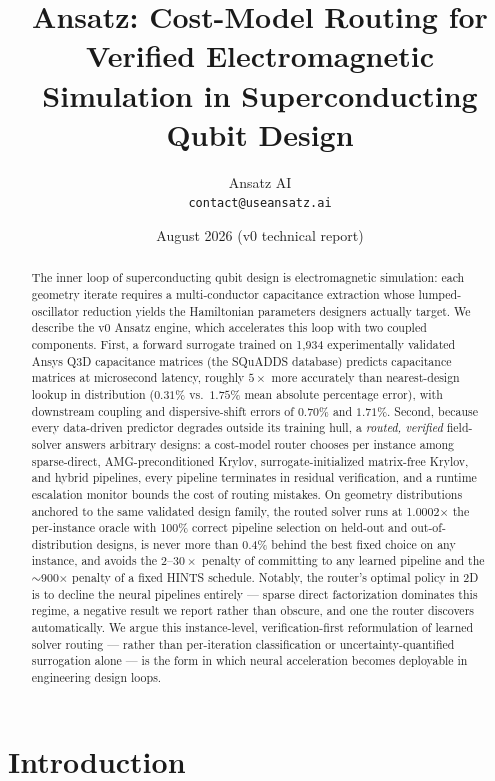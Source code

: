 \documentclass[11pt]{article}
\title{\textbf{Ansatz: Cost-Model Routing for Verified Electromagnetic
Simulation in Superconducting Qubit Design}}
\author{Ansatz AI\\ \texttt{contact@useansatz.ai}}
\date{August 2026 \quad (v0 technical report)}
\newcommand{\capmapegbr}{0.31\%}
\newcommand{\capmapenn}{1.75\%}
\newcommand{\gerrgbr}{0.70\%}
\newcommand{\chierrgbr}{1.71\%}
\begin{document}
\maketitle

\begin{abstract}
The inner loop of superconducting qubit design is electromagnetic simulation:
each geometry iterate requires a multi-conductor capacitance extraction whose
lumped-oscillator reduction yields the Hamiltonian parameters designers
actually target. We describe the v0 Ansatz engine, which accelerates this loop
with two coupled components. First, a forward surrogate trained on 1{,}934
experimentally validated Ansys Q3D capacitance matrices (the SQuADDS database)
predicts capacitance matrices at microsecond latency, roughly $5\times$ more
accurately than nearest-design lookup in distribution ($\capmapegbr$ vs.\
$\capmapenn$ mean absolute percentage error), with downstream coupling and
dispersive-shift errors of $\gerrgbr$ and $\chierrgbr$. Second, because every
data-driven predictor degrades outside its training hull, a \emph{routed,
verified} field-solver answers arbitrary designs: a cost-model router chooses
per instance among sparse-direct, AMG-preconditioned Krylov,
surrogate-initialized matrix-free Krylov, and hybrid pipelines, every pipeline
terminates in residual verification, and a runtime escalation monitor bounds
the cost of routing mistakes. On geometry distributions anchored to the same
validated design family, the routed solver runs at 1.0002$\times$ the
per-instance oracle with 100\% correct pipeline selection on held-out and
out-of-distribution designs, is never more than 0.4\% behind the best fixed
choice on any instance, and avoids the $2$--$30\times$ penalty of committing
to any learned pipeline and the $\sim$900$\times$ penalty of a fixed
HINTS schedule. Notably, the router's optimal policy in 2D is to decline the
neural pipelines entirely --- sparse direct factorization dominates this
regime, a negative result we report rather than obscure, and one the router
discovers automatically. We argue this instance-level, verification-first
reformulation of learned solver routing --- rather than per-iteration
classification or uncertainty-quantified surrogation alone --- is the form in
which neural acceleration becomes deployable in engineering design loops.
\end{abstract}

\section{Introduction}
\label{sec:intro}
\end{document}
